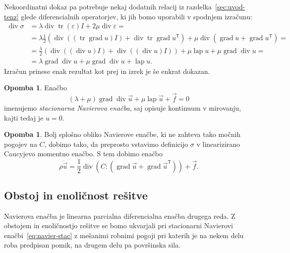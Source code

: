 \documentclass[a4paper,twoside]{article}
\theoremstyle{definition} %
\newtheorem{opomba}[definicija]{Opomba}
\theoremstyle{plain} %
\numberwithin{equation}{section}
\newcommand{\T}{\mathsf{T}}
\newcommand{\lap}{\operatorname{lap}}
\renewcommand{\div}{\operatorname{div}}
\newcommand{\grad}{\operatorname{grad}}
\newcommand{\eps}{\varepsilon}
\newcommand{\vu}{\vec{u}}
\newcommand{\vf}{\vec{f}}
\newcommand{\ts}{\sigma}
\DeclareMathOperator{\tr}{tr}
\begin{document}
Nekoordinatni dokaz pa potrebuje nekaj dodatnih relacij iz
razdelka~\ref{sec:uvod-tenz} glede diferencialnih operatorjev, ki jih bomo
uporabili v spodnjem izračunu:
\begin{align*}
  \div\ts &= \lambda \div \tr(\eps) I + 2\mu \div \eps = \\ &=
  \lambda \frac12(\div((\tr\grad u)I) + \div\tr\grad u^\T) + \mu \div(\grad u + \grad
  u^\T) = \\
  &= \frac{\lambda}{2} (\div((\div u) I) + \div( (\div u)I)) + \mu \lap u + \mu
  \grad \div u = \\
  &= \lambda \grad \div u + \mu \grad \div u + \lap u.
\end{align*}
Izračun prinese enak rezultat kot prej in izrek je še enkrat dokazan.
\endproof
\begin{opomba}
Enačbo
\begin{equation}
    (\lambda + \mu)\grad\div \vu + \mu \lap \vu + \vf  = 0
  \label{eq:navier-stac}
\end{equation}
imenujemo \emph{stacionarna Navierova enačba}, saj opisuje kontinuum v
mirovanju, kajti tedaj je $\dot u = 0$.
\end{opomba}
\begin{opomba}
  Bolj splošno obliko Navierove enačbe, ki ne zahteva tako močnih pogojev na
  $C$, dobimo tako, da preprosto vstavimo definicijo $\ts$ v linearizirano
  Caucyjevo momentno enačbo. S tem dobimo enačbo
  \begin{equation}
    \rho\ddot \vu = \frac12 \div(C:(\grad \vu + \grad\vu^\T)) + \vf.
    \label{eq:navier-general}
  \end{equation}
\end{opomba}

\subsection{Obstoj in enoličnost rešitve}
Navierova enačba je linearna parcialna diferencialna enačba drugega reda.
Z obstojem in enoličnostjo rešitve se bomo ukvarjali pri stacionarni Navierovi
enačbi~\eqref{eq:navier-stac} z mešanimi robnimi pogoji pri katerih je na nekem
delu roba predpisan pomik, na drugem delu pa površinska sila.
\end{document}
